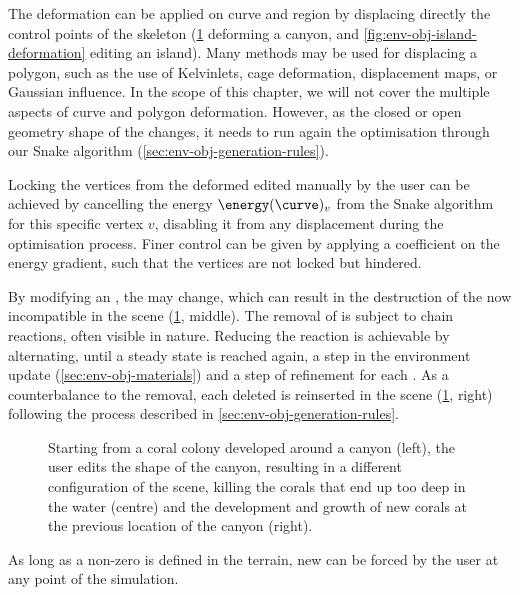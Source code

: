 The deformation  can be applied on curve and region  by displacing directly the control points of the skeleton (\cref{fig:env-obj-user-interaction} deforming a canyon, and \cref{fig:env-obj-island-deformation} editing an island). Many methods may be used for displacing a polygon, such as the use of Kelvinlets, cage deformation, displacement maps, or Gaussian influence. In the scope of this chapter, we will not cover the multiple aspects of curve and polygon deformation. However, as the closed or open geometry shape of the  changes, it needs to run again the  optimisation through our Snake algorithm (\cref{sec:env-obj-generation-rules}).

Locking the vertices from the deformed  edited manually by the user can be achieved by cancelling the energy $\energy(\curve)_v$ from the Snake algorithm for this specific vertex $v$, disabling it from any displacement during the optimisation process. Finer control can be given by applying a coefficient on the energy gradient, such that the vertices are not locked but hindered.

By modifying an , the  may change, which can result in the destruction of the now incompatible  in the scene (\cref{fig:env-obj-user-interaction}, middle). The removal of  is subject to chain reactions, often visible in nature. Reducing the reaction is achievable by alternating, until a steady state is reached again, a step in the environment update (\cref{sec:env-obj-materials}) and a step of  refinement for each . As a counterbalance to the removal, each deleted  is reinserted in the scene (\cref{fig:env-obj-user-interaction}, right) following the process described in \cref{sec:env-obj-generation-rules}.

\begin{figure}
    \caption{Starting from a coral colony developed around a canyon (left), the user edits the shape of the canyon, resulting in a different configuration of the scene, killing the corals that end up too deep in the water (centre) and the development and growth of new corals at the previous location of the canyon (right).}
    \label{fig:env-obj-user-interaction}
\end{figure}

As long as a non-zero  is defined in the terrain, new  can be forced by the user at any point of the simulation.

